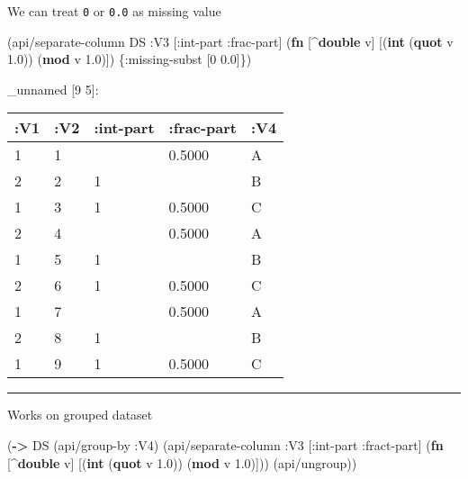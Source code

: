 \documentclass[]{article}
\newenvironment{Shaded}{\begin{snugshade}}{\end{snugshade}}
\newcommand{\KeywordTok}[1]{\textcolor[rgb]{0.13,0.29,0.53}{\textbf{#1}}}
\newcommand{\DecValTok}[1]{\textcolor[rgb]{0.00,0.00,0.81}{#1}}
\newcommand{\FloatTok}[1]{\textcolor[rgb]{0.00,0.00,0.81}{#1}}
\newcommand{\AttributeTok}[1]{\textcolor[rgb]{0.77,0.63,0.00}{#1}}
\newcommand{\NormalTok}[1]{#1}
\begin{document}
We can treat \texttt{0} or \texttt{0.0} as missing value

\begin{Shaded}
\begin{Highlighting}[]
\NormalTok{(api/separate-column DS }\AttributeTok{:V3}\NormalTok{ [}\AttributeTok{:int-part} \AttributeTok{:frac-part}\NormalTok{] (}\KeywordTok{fn}\NormalTok{ [^}\KeywordTok{double}\NormalTok{ v]}
\NormalTok{                                                     [(}\KeywordTok{int}\NormalTok{ (}\KeywordTok{quot}\NormalTok{ v }\FloatTok{1.0}\NormalTok{))}
\NormalTok{                                                      (}\KeywordTok{mod}\NormalTok{ v }\FloatTok{1.0}\NormalTok{)]) \{}\AttributeTok{:missing-subst}\NormalTok{ [}\DecValTok{0} \FloatTok{0.0}\NormalTok{]\})}
\end{Highlighting}
\end{Shaded}

\_unnamed {[}9 5{]}:

\begin{longtable}[]{@{}lllll@{}}
\toprule
:V1 & :V2 & :int-part & :frac-part & :V4\tabularnewline
\midrule
\endhead
1 & 1 & & 0.5000 & A\tabularnewline
2 & 2 & 1 & & B\tabularnewline
1 & 3 & 1 & 0.5000 & C\tabularnewline
2 & 4 & & 0.5000 & A\tabularnewline
1 & 5 & 1 & & B\tabularnewline
2 & 6 & 1 & 0.5000 & C\tabularnewline
1 & 7 & & 0.5000 & A\tabularnewline
2 & 8 & 1 & & B\tabularnewline
1 & 9 & 1 & 0.5000 & C\tabularnewline
\bottomrule
\end{longtable}

\begin{center}\rule{0.5\linewidth}{0.5pt}\end{center}

Works on grouped dataset

\begin{Shaded}
\begin{Highlighting}[]
\NormalTok{(}\KeywordTok{->}\NormalTok{ DS}
\NormalTok{    (api/group-by }\AttributeTok{:V4}\NormalTok{)}
\NormalTok{    (api/separate-column }\AttributeTok{:V3}\NormalTok{ [}\AttributeTok{:int-part} \AttributeTok{:fract-part}\NormalTok{] (}\KeywordTok{fn}\NormalTok{ [^}\KeywordTok{double}\NormalTok{ v]}
\NormalTok{                                                       [(}\KeywordTok{int}\NormalTok{ (}\KeywordTok{quot}\NormalTok{ v }\FloatTok{1.0}\NormalTok{))}
\NormalTok{                                                        (}\KeywordTok{mod}\NormalTok{ v }\FloatTok{1.0}\NormalTok{)]))}
\NormalTok{    (api/ungroup))}
\end{Highlighting}
\end{Shaded}
\end{document}
